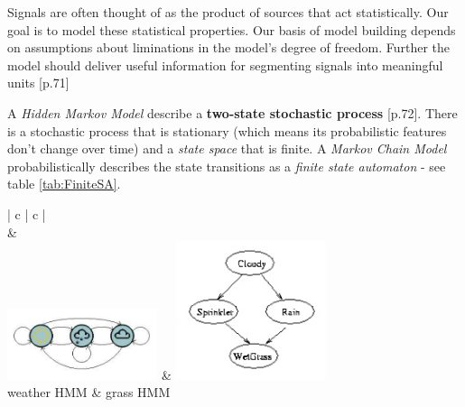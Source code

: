 

Signals are often thought of as the product of sources that act statistically.
Our goal is to model these statistical properties. Our basis of model building depends on 
assumptions about liminations in the model's degree of freedom. 
Further the model should deliver useful information for segmenting signals into meaningful units
\cite{mm_pr}[p.71]

A \emph{Hidden Markov Model} describe a \textbf{two-state stochastic process} \cite{mm_pr}[p.72].
There is a stochastic process that is stationary (which means its probabilistic features don't change over time) and a \emph{state space} that is finite.
A \emph{Markov Chain Model} probabilistically describes the state transitions as a \emph{finite state automaton} - see table \ref{tab:FiniteSA}.

\begin{table}[h]
	\begin{center}
		\begin{tabular}{| c | c |}
			\hline
			 \\
			\hline
			& \\
			\includegraphics[width=0.33\textwidth]{./Images/FiniteStateAutomaton_1.png} & \includegraphics[width=0.33\textwidth]{./Images/FiniteStateAutomaton_2.png} \\
			\hline
			weather HMM \cite{hmm_fb} & grass HMM \cite{gm_bn} \\
			\hline
		\end{tabular}
	\end{center}
	\caption{Two finite state automatons that describe the state space of two different HMMs. Nodes correspond to states and edges to transition probabilites betwenn states that are bigger than $0$.}
	\label{tab:FiniteSA}
\end{table}

